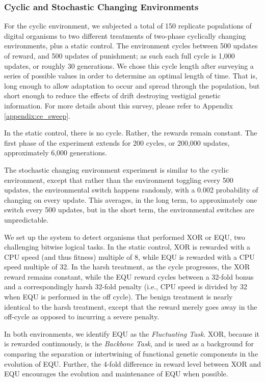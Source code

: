 \documentclass[PhD]{msu-thesis}
\begin{document}
\subsubsection{Cyclic and Stochastic Changing Environments}
For the cyclic environment, we subjected a total of 150 replicate populations of digital organisms to two different treatments of two-phase cyclically changing environments, plus a static control. The environment cycles between 500 updates of reward, and 500 updates of punishment; as such each full cycle is 1,000 updates, or roughly 30 generations. We chose this cycle length after surveying a series of possible values in order to determine an optimal length of time. That is, long enough to allow adaptation to occur and spread through the population, but short enough to reduce the effects of drift destroying vestigial genetic information. For more details about this survey, please refer to Appendix \ref{appendix:ce_sweep}.

In the static control, there is no cycle. Rather, the rewards remain constant. The first phase of the experiment extends for 200 cycles, or 200,000 updates, approximately 6,000 generations.

The stochastic changing environment experiment is similar to the cyclic environment, except that rather than the environment toggling every 500 updates, the environmental switch happens randomly, with a 0.002 probability of changing on every update. This averages, in the long term, to approximately one switch every 500 updates, but in the short term, the environmental switches are unpredictable.

We set up the system to detect organisms that performed XOR or EQU, two challenging bitwise logical tasks. In the static control, XOR is rewarded with a CPU speed (and thus fitness) multiple of 8, while EQU is rewarded with a CPU speed multiple of 32. In the harsh treatment, as the cycle progresses, the XOR reward remains constant, while the EQU reward cycles between a 32-fold bonus and a correspondingly harsh 32-fold penalty (i.e., CPU speed is divided by 32 when EQU is performed in the off cycle). The benign treatment is nearly identical to the harsh treatment, except that the reward merely goes away in the off-cycle as opposed to incurring a severe penalty.

In both environments, we identify EQU as the \textit{Fluctuating Task}. XOR, because it is rewarded continuously, is the \textit{Backbone Task}, and is used as a background for comparing the separation or intertwining of functional genetic components in the evolution of EQU. Further, the 4-fold difference in reward level between XOR and EQU encourages the evolution and maintenance of EQU when possible.
\end{document}
